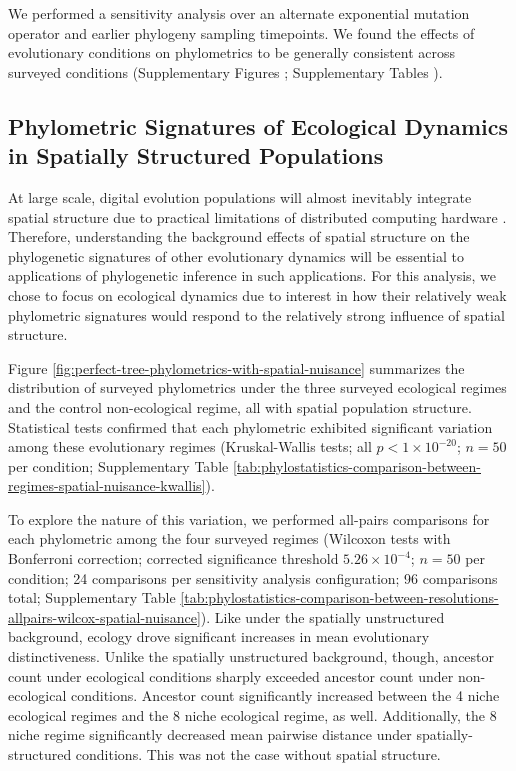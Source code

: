 We performed a sensitivity analysis over an alternate exponential mutation operator and earlier phylogeny sampling timepoints.
We found the effects of evolutionary conditions on phylometrics to be generally consistent across surveyed conditions (Supplementary Figures ; Supplementary Tables ).

\subsection{Phylometric Signatures of Ecological Dynamics in Spatially Structured Populations}



At large scale, digital evolution populations will almost inevitably integrate spatial structure due to practical limitations of distributed computing hardware \citep{ackley2014indefinitely}.
Therefore, understanding the background effects of spatial structure on the phylogenetic signatures of other evolutionary dynamics will be essential to applications of phylogenetic inference in such applications.
For this analysis, we chose to focus on ecological dynamics due to interest in how their relatively weak phylometric signatures would respond to the relatively strong influence of spatial structure.

Figure \ref{fig:perfect-tree-phylometrics-with-spatial-nuisance} summarizes the distribution of surveyed phylometrics under the three surveyed ecological regimes and the control non-ecological regime, all with spatial population structure.
Statistical tests confirmed that each phylometric exhibited significant variation among these evolutionary regimes (Kruskal-Wallis tests; all $p < 1\times10^{-20}$; $n=50$ per condition; Supplementary Table \ref{tab:phylostatistics-comparison-between-regimes-spatial-nuisance-kwallis}).

To explore the nature of this variation, we performed all-pairs comparisons for each phylometric among the four surveyed regimes (Wilcoxon tests with Bonferroni correction; corrected significance threshold $5.26 \times 10^{-4}$; $n=50$ per condition; 24 comparisons per sensitivity analysis configuration; 96 comparisons total; Supplementary Table \ref{tab:phylostatistics-comparison-between-resolutions-allpairs-wilcox-spatial-nuisance}).
Like under the spatially unstructured background, ecology drove significant increases in mean evolutionary distinctiveness.
Unlike the spatially unstructured background, though, ancestor count under ecological conditions sharply exceeded ancestor count under non-ecological conditions.
Ancestor count significantly increased between the 4 niche ecological regimes and the 8 niche ecological regime, as well.
Additionally, the 8 niche regime significantly decreased mean pairwise distance under spatially-structured conditions.
This was not the case without spatial structure.

